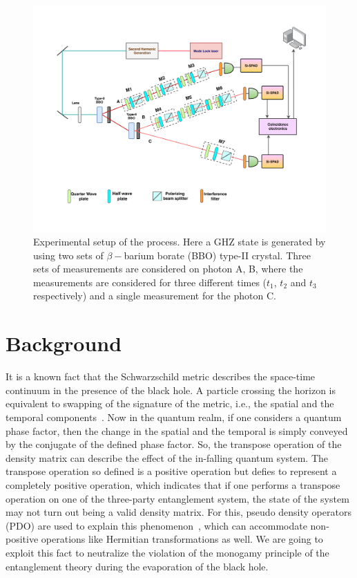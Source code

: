 \documentclass[fleqn,usenatbib]{mnras}
\begin{document}
\begin{figure}
	\includegraphics[width=\columnwidth]{plots/Optic.pdf}
    \caption{Experimental setup of the process. Here a GHZ state is generated by using two sets of $\beta-$barium borate (BBO) type-II crystal. Three sets of measurements are considered on photon A, B, where the measurements are considered for three different times ($t_1$,  $t_2$ and $t_3$ respectively) and a single measurement for the photon C.}
    \label{f3}
\end{figure}



\section{Background}\label{sec2}
It is a known fact that the Schwarzschild metric describes the space-time continuum in the presence of the black hole. A particle crossing the horizon is equivalent to swapping of the signature of the metric, i.e., the spatial and the temporal components~\citep{misner}. Now in the quantum realm, if one considers a quantum phase factor, then the change in the spatial and the temporal is simply conveyed by the conjugate of the defined phase factor.  So, the transpose operation of the density matrix can describe the effect of the in-falling quantum system. The transpose operation so defined is a positive operation but defies to represent a completely positive operation, which indicates that if one performs a transpose operation on one of the three-party entanglement system, the state of the system may not turn out being a valid density matrix. For this, pseudo density operators (PDO) are used to explain this phenomenon~\citep{fitz},  which can accommodate non-positive operations like Hermitian transformations as well. We are going to exploit this fact to neutralize the violation of the monogamy principle of the entanglement theory during the evaporation of the black hole.
\end{document}
